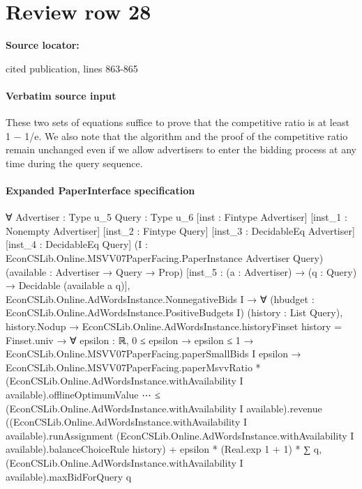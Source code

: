 \documentclass[10pt]{article}
\begin{document}
\section*{Review row 28}
\textbf{Source locator:} {\footnotesize\raggedright cited publication, lines 863-\allowbreak{}865\par}
\paragraph{Verbatim source input}
\begin{ReviewVerbatim}
These two sets of equations suffice to prove that the competitive ratio is at least 1 − 1/e. We
also note that the algorithm and the proof of the competitive ratio remain unchanged even if
we allow advertisers to enter the bidding process at any time during the query sequence.
\end{ReviewVerbatim}


\paragraph{Expanded PaperInterface specification}
\begin{ReviewVerbatim}
∀ {Advertiser : Type u_5} {Query : Type u_6} [inst : Fintype Advertiser] [inst_1 : Nonempty Advertiser]
  [inst_2 : Fintype Query] [inst_3 : DecidableEq Advertiser] [inst_4 : DecidableEq Query]
  (I : EconCSLib.Online.MSVV07PaperFacing.PaperInstance Advertiser Query) (available : Advertiser → Query → Prop)
  [inst_5 : (a : Advertiser) → (q : Query) → Decidable (available a q)],
  EconCSLib.Online.AdWordsInstance.NonnegativeBids I →
    ∀ (hbudget : EconCSLib.Online.AdWordsInstance.PositiveBudgets I) (history : List Query),
      history.Nodup →
        EconCSLib.Online.AdWordsInstance.historyFinset history = Finset.univ →
          ∀ {epsilon : ℝ},
            0 ≤ epsilon →
              epsilon ≤ 1 →
                EconCSLib.Online.MSVV07PaperFacing.paperSmallBids I epsilon →
                  EconCSLib.Online.MSVV07PaperFacing.paperMsvvRatio *
                      (EconCSLib.Online.AdWordsInstance.withAvailability I available).offlineOptimumValue ⋯ ≤
                    (EconCSLib.Online.AdWordsInstance.withAvailability I available).revenue
                        ((EconCSLib.Online.AdWordsInstance.withAvailability I available).runAssignment
                          (EconCSLib.Online.AdWordsInstance.withAvailability I available).balanceChoiceRule history) +
                      epsilon * (Real.exp 1 + 1) *
                        ∑ q, (EconCSLib.Online.AdWordsInstance.withAvailability I available).maxBidForQuery q
\end{ReviewVerbatim}
\end{document}
